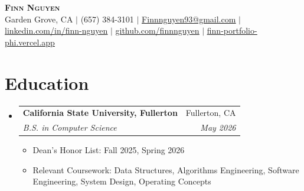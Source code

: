 \documentclass[letterpaper,11pt]{article}
\makeatletter
\newcommand{\resumeItem}[1]{
  \item\small{
    {#1 \vspace{-2pt}}
  }
}
\newcommand{\resumeSubheading}[4]{
  \vspace{-2pt}\item
    \begin{tabular*}{0.97\textwidth}[t]{l@{\extracolsep{\fill}}r}
      \textbf{#1} & #2 \\
      \textit{\small#3} & \textit{\small #4} \\
    \end{tabular*}\vspace{-7pt}
}
\newcommand{\resumeSubHeadingListStart}{\begin{itemize}[leftmargin=0.15in, label={}]}
\newcommand{\resumeSubHeadingListEnd}{\end{itemize}}
\newcommand{\resumeItemListStart}{\begin{itemize}}
\newcommand{\resumeItemListEnd}{\end{itemize}\vspace{-5pt}}
\makeatother
\begin{document}
\begin{center}
    \textbf{\Huge \scshape Finn Nguyen} \\ \vspace{1pt}
    \small Garden Grove, CA $|$ (657) 384-3101 $|$ \href{mailto:Finnnguyen93@gmail.com}{\underline{Finnnguyen93@gmail.com}} $|$
    \href{https://linkedin.com/in/finn-nguyen}{\underline{linkedin.com/in/finn-nguyen}} $|$
    \href{https://github.com/finnnguyen}{\underline{github.com/finnnguyen}} $|$
    \href{https://finn-portfolio-phi.vercel.app/}{\underline{finn-portfolio-phi.vercel.app}}
\end{center}


\section{Education}
  \resumeSubHeadingListStart
    \resumeSubheading
      {California State University, Fullerton}{Fullerton, CA}
      {B.S. in Computer Science}{May 2026}
      \resumeItemListStart
        \resumeItem{Dean's Honor List: Fall 2025, Spring 2026}
        \resumeItem{Relevant Coursework: Data Structures, Algorithms Engineering, Software Engineering, System Design, Operating Concepts}
      \resumeItemListEnd
  \resumeSubHeadingListEnd


\end{document}
